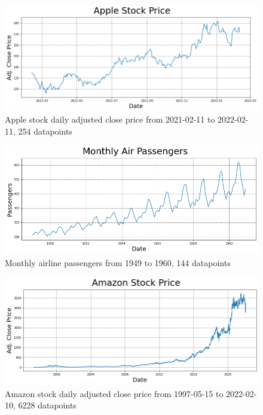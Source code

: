 \documentclass[conference]{IEEEtran}
\begin{document}
\begin{figure}
\begin{center}
\includegraphics[scale=0.50]{AAPL_time_series.png}
\caption{Apple stock daily adjusted close price from 2021-02-11 to 2022-02-11, 254 datapoints}
\label{fig:AAPL_time_series}
\end{center}
\end{figure}

\begin{figure}
\begin{center}
\includegraphics[scale=0.50]{AirPassengers_time_series.png}
\caption{Monthly airline passengers from 1949 to 1960, 144 datapoints}
\label{fig:AirPassengers_time_series}
\end{center}
\end{figure}

\begin{figure}
\begin{center}
\includegraphics[scale=0.50]{AMZN_time_series.png}
\caption{Amazon stock daily adjusted close price from 1997-05-15 to 2022-02-10, 6228 datapoints}
\label{fig:}
\end{center}
\end{figure}
\end{document}
